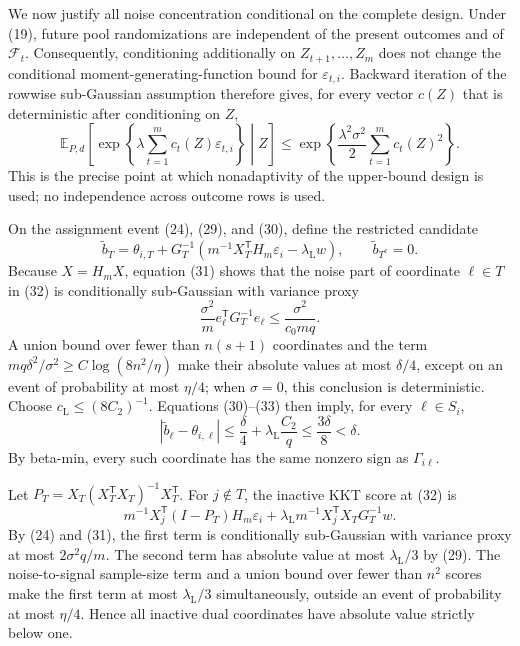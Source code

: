 We now justify all noise concentration conditional on the complete design.  Under (19), future pool randomizations are independent of the present outcomes and of \(\mathcal F_t\).  Consequently, conditioning additionally on \(Z_{t+1},\ldots,Z_m\) does not change the conditional moment-generating-function bound for \(\varepsilon_{t,i}\).  Backward iteration of the rowwise sub-Gaussian assumption therefore gives, for every vector \(c(Z)\) that is deterministic after conditioning on \(Z\),
\[
 \mathbb E_{P,d}\!\left[\exp\!\left\{\lambda\sum_{t=1}^m c_t(Z)\varepsilon_{t,i}\right\}\middle|Z\right]
 \le\exp\!\left\{\frac{\lambda^2\sigma^2}{2}\sum_{t=1}^mc_t(Z)^2\right\}. \tag{31}
\]
This is the precise point at which nonadaptivity of the upper-bound design is used; no independence across outcome rows is used.

On the assignment event (24), (29), and (30), define the restricted candidate
\[
 \widetilde b_T=\theta_{i,T}
 +G_T^{-1}\left(m^{-1}X_T^{\mathsf T}H_m\varepsilon_i
                   -\lambda_{\mathrm L}w\right),
 \qquad \widetilde b_{T^c}=0. \tag{32}
\]
Because \(X=H_mX\), equation (31) shows that the noise part of coordinate \(\ell\in T\) in (32) is conditionally sub-Gaussian with variance proxy
\[
 \frac{\sigma^2}{m}e_\ell^{\mathsf T}G_T^{-1}e_\ell
 \le\frac{\sigma^2}{c_0mq}. \tag{33}
\]
A union bound over fewer than \(n(s+1)\) coordinates and the term
\(mq\delta^2/\sigma^2\ge C\log(8n^2/\eta)\) make their absolute values at most \(\delta/4\), except on an event of probability at most \(\eta/4\); when \(\sigma=0\), this conclusion is deterministic.  Choose \(c_{\mathrm L}\le(8C_2)^{-1}\).  Equations (30)--(33) then imply, for every \(\ell\in S_i\),
\[
 |\widetilde b_\ell-\theta_{i,\ell}|
 \le\frac\delta4+\lambda_{\mathrm L}\frac{C_2}{q}
 \le\frac{3\delta}{8}<\delta. \tag{34}
\]
By beta-min, every such coordinate has the same nonzero sign as \(\Gamma_{i\ell}\).

Let \(P_T=X_T(X_T^{\mathsf T}X_T)^{-1}X_T^{\mathsf T}\).  For \(j\notin T\), the inactive KKT score at (32) is
\[
 m^{-1}X_j^{\mathsf T}(I-P_T)H_m\varepsilon_i
 +\lambda_{\mathrm L}m^{-1}X_j^{\mathsf T}X_TG_T^{-1}w. \tag{35}
\]
By (24) and (31), the first term is conditionally sub-Gaussian with variance proxy at most \(2\sigma^2q/m\).  The second term has absolute value at most \(\lambda_{\mathrm L}/3\) by (29).  The noise-to-signal sample-size term and a union bound over fewer than \(n^2\) scores make the first term at most \(\lambda_{\mathrm L}/3\) simultaneously, outside an event of probability at most \(\eta/4\).  Hence all inactive dual coordinates have absolute value strictly below one.

